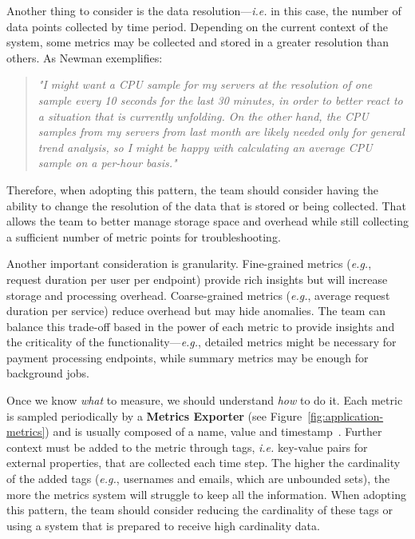 \documentclass[runningheads]{llncs}
\begin{document}
Another thing to consider is the data resolution---\textit{i.e.} in this case, the number of data points collected by time period. Depending on the current context of the system, some metrics may be collected and stored in a greater resolution than others. As Newman exemplifies: 

\begin{quote}
    \textit{"I might want a CPU sample for my servers at the resolution of one sample every 10 seconds for the last 30 minutes, in order to better react to a situation that is currently unfolding. On the other hand, the CPU samples from my servers from last month are likely needed only for general trend analysis, so I might be happy with calculating an average CPU sample on a per-hour basis." }~\cite[p.~322]{Newman-2021}
\end{quote}

Therefore, when adopting this pattern, the team should consider having the ability to change the resolution of the data that is stored or being collected. That allows the team to better manage storage space and overhead while still collecting a sufficient number of metric points for troubleshooting.

Another important consideration is granularity. Fine-grained metrics (\textit{e.g.}, request duration per user per endpoint) provide rich insights but will increase storage and processing overhead. Coarse-grained metrics (\textit{e.g.}, average request duration per service) reduce overhead but may hide anomalies. The team can balance this trade-off based in the power of each metric to provide insights and the criticality of the functionality---\textit{e.g.}, detailed metrics might be necessary for payment processing endpoints, while summary metrics may be enough for background jobs.

Once we know \textit{what} to measure, we should understand \textit{how} to do it. Each metric is sampled periodically by a \textbf{Metrics Exporter} (see Figure~\ref{fig:application-metrics}) and is usually composed of a name, value and timestamp~\cite{Richardson-Wiki-2021}. Further context must be added to the metric through tags, \textit{i.e.} key-value pairs for external properties, that are collected each time step. The higher the cardinality of the added tags (\textit{e.g.}, usernames and emails, which are unbounded sets), the more the metrics system will struggle to keep all the information. When adopting this pattern, the team should consider reducing the cardinality of these tags or using a system that is prepared to receive high cardinality data.
\end{document}
